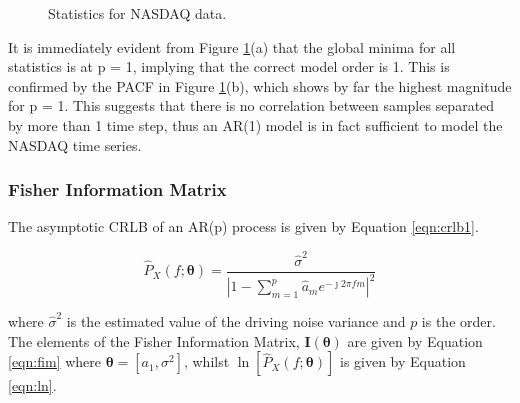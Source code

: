\begin{figure}[H]
    \centering
    \caption{Statistics for NASDAQ data.}
    \label{fig:nasdaq}
\end{figure}

\noindent
It is immediately evident from Figure \ref{fig:nasdaq}(a) that the global minima for all statistics is at p = 1, implying that the correct model order is 1. This is confirmed by the PACF in Figure \ref{fig:nasdaq}(b), which shows by far the highest magnitude for p = 1. This suggests that there is no correlation between samples separated by more than 1 time step, thus an AR(1) model is in fact sufficient to model the NASDAQ time series.

\subsubsection{Fisher Information Matrix}

The asymptotic CRLB of an AR(p) process is given by Equation \ref{eqn:crlb1}.

\begin{equation}
\hat{P}_{X}(f ; \boldsymbol{\theta})=\frac{\hat{\sigma}^{2}}{\left|1-\sum_{m=1}^{p} \hat{a}_{m} e^{-\jmath 2 \pi f m}\right|^{2}}
\label{eqn:crlb1}
\end{equation}

\noindent
where $\hat{\sigma}^{2}$ is the estimated value of the driving noise variance and $p$ is the order. The elements of the Fisher Information Matrix, $\boldsymbol{I}(\boldsymbol{\theta})$ are given by Equation \ref{eqn:fim} where $\boldsymbol{\theta}=\left[a_{1}, \sigma^{2}\right]$, whilst $\ln \left[\hat{P}_{X}(f ; \boldsymbol{\theta})\right]$ is given by Equation \ref{eqn:ln}.

